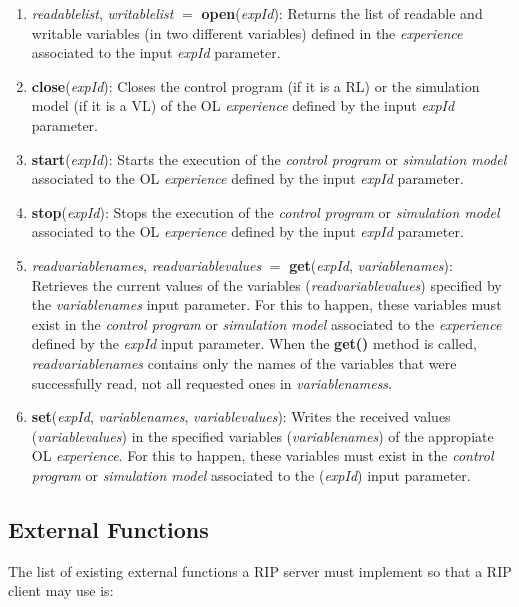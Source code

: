 \begin{enumerate}
    \item \textit{readablelist}, \textit{writablelist}  $=$ \textbf{open}(\textit{expId}): Returns the list of readable and writable variables (in two different variables) defined in the \textit{experience} associated to the input \textit{expId} parameter.
    \item \textbf{close}(\textit{expId}): Closes the control program (if it is a RL) or the simulation model (if it is a VL) of the OL \textit{experience} defined by the input \textit{expId} parameter.
    \item \textbf{start}(\textit{expId}): Starts the execution of the \textit{control program} or \textit{simulation model} associated to the OL \textit{experience} defined by the input \textit{expId} parameter.
    \item \textbf{stop}(\textit{expId}): Stops the execution of the \textit{control program} or \textit{simulation model} associated to the OL \textit{experience} defined by the input \textit{expId} parameter.
    \item \textit{readvariablenames}, \textit{readvariablevalues} $=$ \textbf{get}(\textit{expId}, \textit{variablenames}): Retrieves the current values of the variables (\textit{readvariablevalues}) specified by the \textit{variablenames} input parameter. For this to happen, these variables must exist in the \textit{control program} or \textit{simulation model} associated to the \textit{experience} defined by the \textit{expId} input parameter. When the \textbf{get()} method is called, \textit{readvariablenames} contains only the names of the variables that were successfully read, not all requested ones in \textit{variablenamess}.
    \item \textbf{set}(\textit{expId}, \textit{variablenames}, \textit{variablevalues}): Writes the received values (\textit{variablevalues}) in the specified variables (\textit{variablenames}) of the appropiate OL \textit{experience}. For this to happen, these variables must exist in the \textit{control program} or \textit{simulation model} associated to the (\textit{expId}) input parameter.
\end{enumerate}

\subsection{External Functions}
\label{sec:External_Functions}
The list of existing external functions a RIP server must implement so that a RIP client may use is:

